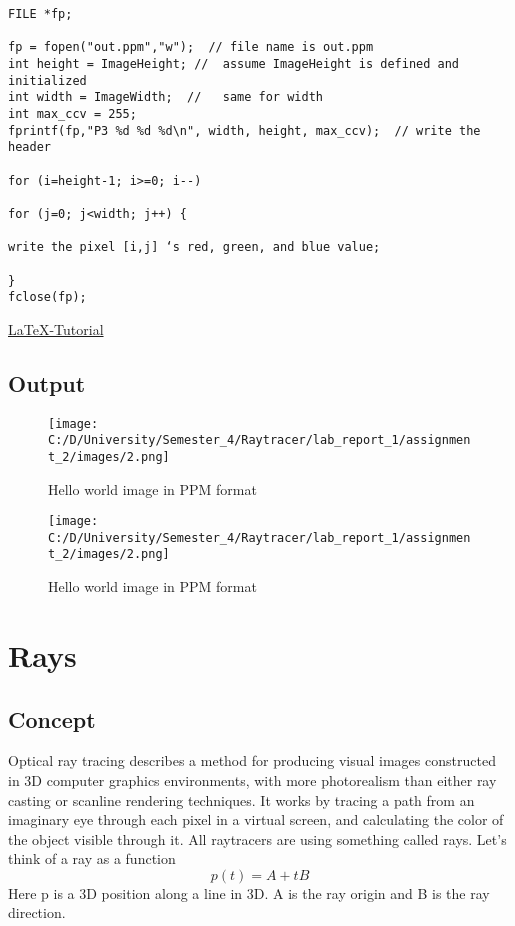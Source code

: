 \documentclass{article}
\begin{document}
\begin{verbatim}

\end{verbatim}
\begin{lstlisting}
FILE *fp;

fp = fopen("out.ppm","w");  // file name is out.ppm
int height = ImageHeight; //  assume ImageHeight is defined and initialized
int width = ImageWidth;  //   same for width
int max_ccv = 255;
fprintf(fp,"P3 %d %d %d\n", width, height, max_ccv);  // write the header

for (i=height-1; i>=0; i--)

for (j=0; j<width; j++) {
	
write the pixel [i,j] ‘s red, green, and blue value;
	
}
fclose(fp);
\end{lstlisting}
\href{https://web.cse.ohio-state.edu/~shen.94/681/Site/ppm_help.html}{LaTeX-Tutorial}

 \clearpage
\subsection{Output}
\begin{figure}[h]
	\begin{center}
	\texttt{[image: C:/D/University/Semester\_4/Raytracer/lab\_report\_1/assignment\_2/images/2.png]}
	
	\caption{Hello world image in PPM format}
	\label{fig:boat1}
	\end{center}
\end{figure}


\begin{figure}[h]
	\begin{center}
		\texttt{[image: C:/D/University/Semester\_4/Raytracer/lab\_report\_1/assignment\_2/images/2.png]}
		
		\caption{Hello world image in PPM format}
		\label{fig:boat1}
	\end{center}
\end{figure}
 \clearpage

\section{Rays}
\subsection{Concept}
Optical ray tracing describes a method for producing visual images constructed in 3D computer graphics environments, with more photorealism than either ray casting or scanline rendering techniques. It works by tracing a path from an imaginary eye through each pixel in a virtual screen, and calculating the color of the object visible through it.
All raytracers are using something called rays. Let’s think of a ray as a function \[p (t) = A + tB\] Here p is a 3D position along a line
in 3D. A is the ray origin and B is the ray direction.
\end{document}

